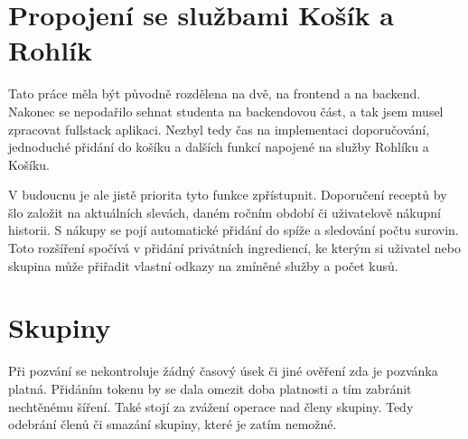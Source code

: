 \section{Propojení se službami Košík a Rohlík}
Tato práce měla být původně rozdělena na dvě, na frontend a na backend. Nakonec se nepodařilo sehnat studenta na backendovou část,
a tak jsem musel zpracovat fullstack aplikaci. Nezbyl tedy čas na implementaci doporučování, jednoduché přidání do košíku a dalších
funkcí napojené na služby Rohlíku a Košíku.

V budoucnu je ale jistě priorita tyto funkce zpřístupnit. Doporučení receptů by šlo založit na aktuálních slevách, daném ročním období či
uživatelově nákupní historii. S nákupy se pojí automatické přidání do spíže a sledování počtu surovin. Toto rozšíření spočívá v přidání
privátních ingrediencí, ke kterým si uživatel nebo skupina může přiřadit vlastní odkazy na zmíněné služby a počet kusů.

\section{Skupiny}
Při pozvání se nekontroluje žádný časový úsek či jiné ověření zda je pozvánka platná. Přidáním tokenu by se dala omezit doba platnosti
a tím zabránit nechtěnému šíření. Také stojí za zvážení operace nad členy skupiny. Tedy odebrání členů či smazání skupiny, které je zatím
nemožné.
